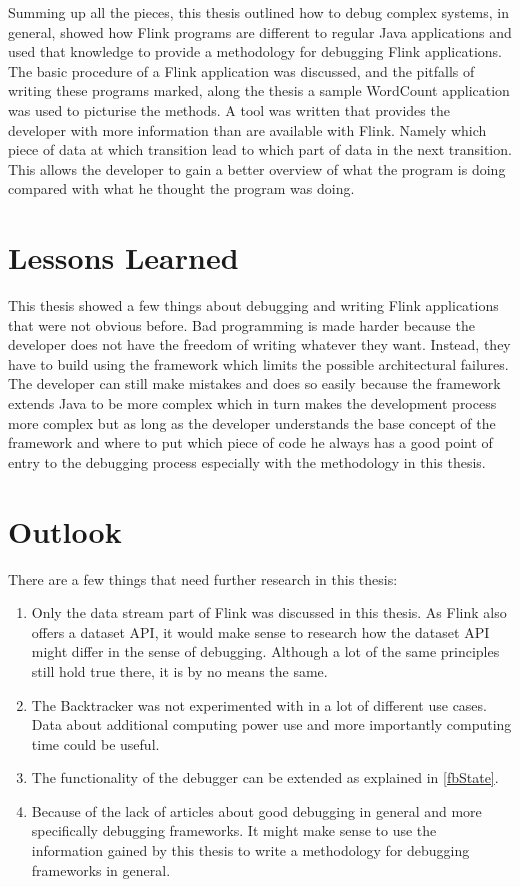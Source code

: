 Summing up all the pieces, this thesis outlined how to debug complex systems, in general, showed how Flink programs are different to regular Java applications and used that knowledge to provide a methodology for debugging Flink applications. The basic procedure of a Flink application was discussed, and the pitfalls of writing these programs marked, along the thesis a sample WordCount application was used to picturise the methods. A tool was written that provides the developer with more information than are available with Flink. Namely which piece of data at which transition lead to which part of data in the next transition. This allows the developer to gain a better overview of what the program is doing compared with what he thought the program was doing.

\section{Lessons Learned}
This thesis showed a few things about debugging and writing Flink applications that were not obvious before. Bad programming is made harder because the developer does not have the freedom of writing whatever they want. Instead, they have to build using the framework which limits the possible architectural failures. The developer can still make mistakes and does so easily because the framework extends Java to be more complex which in turn makes the development process more complex but as long as the developer understands the base concept of the framework and where to put which piece of code he always has a good point of entry to the debugging process especially with the methodology in this thesis.

\pagebreak

\section{Outlook}
There are a few things that need further research in this thesis:
\begin{enumerate}
  \item Only the data stream part of Flink was discussed in this thesis. As Flink also offers a dataset API, it would make sense to research how the dataset API might differ in the sense of debugging. Although a lot of the same principles still hold true there, it is by no means the same.
  \item The Backtracker was not experimented with in a lot of different use cases. Data about additional computing power use and more importantly computing time could be useful.
  \item The functionality of the debugger can be extended as explained in \ref{fbState}.
  \item Because of the lack of articles about good debugging in general and more specifically debugging frameworks. It might make sense to use the information gained by this thesis to write a methodology for debugging frameworks in general.
\end{enumerate}

